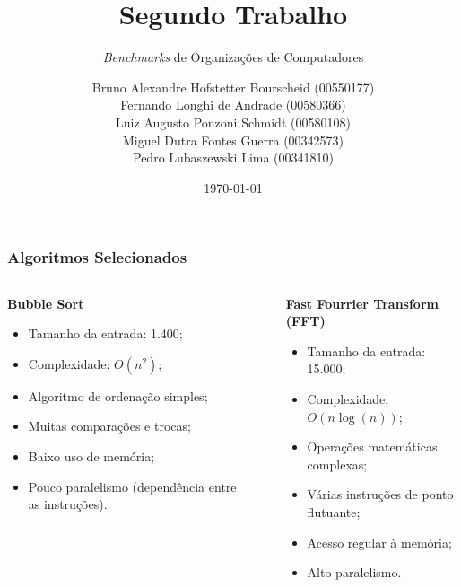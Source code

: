 \documentclass{beamer}
\title[Segundo Trabalho]{Segundo Trabalho}
\subtitle{\textit{Benchmarks} de Organizações de Computadores}
\author[Grupo 13]{Bruno Alexandre Hofstetter Bourscheid (00550177)
              \\ Fernando Longhi de Andrade (00580366)
              \\ Luiz Augusto Ponzoni Schmidt (00580108)
              \\ Miguel Dutra Fontes Guerra (00342573)
              \\ Pedro Lubaszewski Lima (00341810)}
\institute[]{INF01113\\Organização De Computadores B}
\date[\today]{\today}
\begin{document}
    \begin{frame}
        \maketitle
    \end{frame}

    \begin{frame}
        \frametitle{Algoritmos Selecionados}
        \begin{columns}
            \begin{column}{0.33\textwidth}

                \begin{center}
                    \textbf{Bubble Sort}
                \end{center}

                \begin{itemize}
                    \footnotesize
                    \item Tamanho da entrada: 1.400;
                    \item Complexidade: $O(n^2)$;
                    \item Algoritmo de ordenação simples;
                    \item Muitas comparações e trocas;
                    \item Baixo uso de memória;
                    \item Pouco paralelismo (dependência entre as instruções).
                \end{itemize}

            \end{column}

            \begin{column}{0.01\textwidth}
                \rule{.1mm}{0.75\textheight}
            \end{column}

            \begin{column}{0.33\textwidth}

                \begin{center}
                    \textbf{Fast Fourrier Transform (FFT)}
                \end{center}

                \begin{itemize}
                    \footnotesize
                    \item Tamanho da entrada: 15.000;
                    \item Complexidade: $O(n\log(n))$;
                    \item Operações matemáticas complexas;
                    \item Várias instruções de ponto flutuante;
                    \item Acesso regular à memória;
                    \item Alto paralelismo.
                \end{itemize}


\end{column}
\end{columns}
\end{frame}
\end{document}
